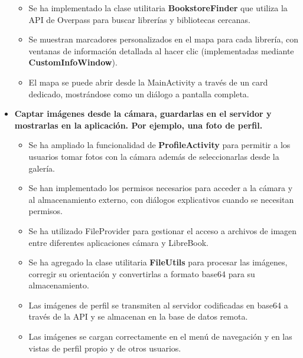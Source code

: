 \documentclass[a4paper,11pt]{report}
\begin{document}
\begin{itemize}
\begin{itemize}
            \item Se ha implementado la clase utilitaria \textbf{BookstoreFinder} que utiliza la API de Overpass para buscar librerías y bibliotecas cercanas.
            \item Se muestran marcadores personalizados en el mapa para cada librería, con ventanas de información detallada al hacer clic (implementadas mediante \textbf{CustomInfoWindow}).
            \item El mapa se puede abrir desde la MainActivity a través de un card dedicado, mostrándose como un diálogo a pantalla completa.
          \end{itemize} 
        \item \textbf{Captar imágenes desde la cámara, guardarlas en el servidor y mostrarlas en la aplicación. Por ejemplo, una foto de perfil.}
          \begin{itemize}
            \item Se ha ampliado la funcionalidad de \textbf{ProfileActivity} para permitir a los usuarios tomar fotos con la cámara además de seleccionarlas desde la galería.
            \item Se han implementado los permisos necesarios para acceder a la cámara y al almacenamiento externo, con diálogos explicativos cuando se necesitan permisos.
            \item Se ha utilizado FileProvider para gestionar el acceso a archivos de imagen entre diferentes aplicaciones cámara y LibreBook.
            \item Se ha agregado la clase utilitaria \textbf{FileUtils} para procesar las imágenes, corregir su orientación y convertirlas a formato base64 para su almacenamiento.
            \item Las imágenes de perfil se transmiten al servidor codificadas en base64 a través de la API y se almacenan en la base de datos remota.
            \item Las imágenes se cargan correctamente en el menú de navegación y en las vistas de perfil propio y de otros usuarios.
          \end{itemize}
      \end{itemize}
\end{document}
